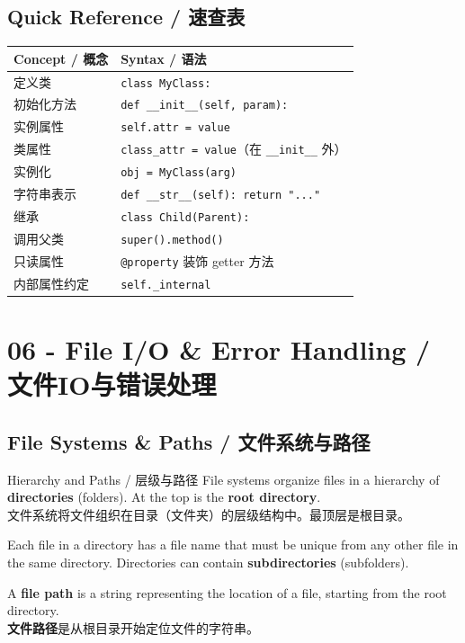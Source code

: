 \documentclass[11pt,a4paper]{report}
\let\oldtexttt\texttt
\renewcommand{\texttt}[1]{\textcolor{mainblue}{\oldtexttt{#1}}}
\begin{document}
\section{Quick Reference / 速查表}

\medskip
\centering
\small
\renewcommand{\arraystretch}{1.3}
\begin{tabular}{@{}ll@{}}
\toprule
\textbf{Concept / 概念} & \textbf{Syntax / 语法} \\ \midrule
定义类 & \texttt{class MyClass:} \\
初始化方法 & \texttt{def \_\_init\_\_(self, param):} \\
实例属性 & \texttt{self.attr = value} \\
类属性 & \texttt{class\_attr = value}（在 \texttt{\_\_init\_\_} 外） \\
实例化 & \texttt{obj = MyClass(arg)} \\
字符串表示 & \texttt{def \_\_str\_\_(self): return "..."} \\
继承 & \texttt{class Child(Parent):} \\
调用父类 & \texttt{super().method()} \\
只读属性 & \texttt{@property} 装饰 getter 方法 \\
内部属性约定 & \texttt{self.\_internal} \\ \bottomrule
\end{tabular}
\medskip



\chapter{06 - File I/O \& Error Handling / 文件IO与错误处理}



\section{File Systems \& Paths / 文件系统与路径}

\begin{concept}{Hierarchy and Paths / 层级与路径}
    File systems organize files in a hierarchy of \textbf{directories} (folders). At the top is the \textbf{root directory}. \\
    文件系统将文件组织在目录（文件夹）的层级结构中。最顶层是根目录。

    Each file in a directory has a file name that must be unique from any other file in the same directory. Directories can contain \textbf{subdirectories} (subfolders).

    A \textbf{file path} is a string representing the location of a file, starting from the root directory. \\
    \textbf{文件路径}是从根目录开始定位文件的字符串。
\end{concept}
\end{document}

